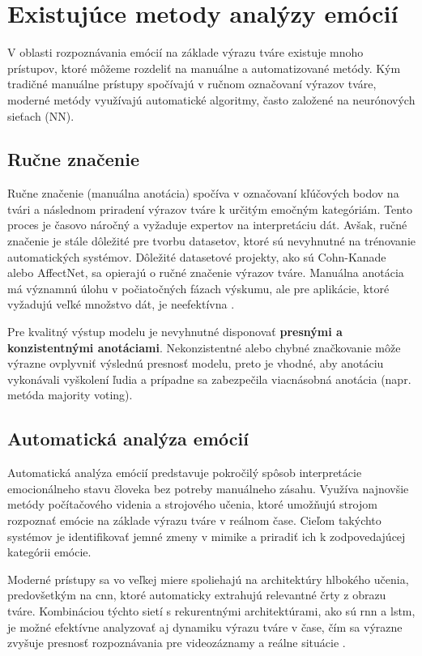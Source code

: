 \section{Existujúce metody analýzy emócií}
V oblasti rozpoznávania emócií na základe výrazu tváre existuje mnoho prístupov, ktoré môžeme rozdeliť na manuálne a automatizované metódy. Kým tradičné manuálne prístupy spočívajú v ručnom označovaní 
výrazov tváre, moderné metódy využívajú automatické algoritmy, často založené na neurónových sieťach (NN).

\subsection{Ručne značenie}
Ručne značenie (manuálna anotácia) spočíva v označovaní kľúčových bodov na tvári a následnom priradení výrazov tváre k určitým emočným kategóriám. Tento proces je časovo náročný a vyžaduje expertov 
na interpretáciu dát. Avšak, ručné značenie je stále dôležité pre tvorbu datasetov, ktoré sú nevyhnutné na trénovanie automatických systémov. Dôležité datasetové projekty, ako sú Cohn-Kanade alebo AffectNet, 
sa opierajú o ručné značenie výrazov tváre​. Manuálna anotácia má významnú úlohu v počiatočných fázach výskumu, ale pre aplikácie, ktoré vyžadujú veľké množstvo dát, je neefektívna \cite{article01}.

Pre kvalitný výstup modelu je nevyhnutné disponovať \textbf{presnými a konzistentnými anotáciami}. Nekonzistentné alebo chybné značkovanie môže výrazne ovplyvniť výslednú presnosť modelu, preto je vhodné, 
aby anotáciu vykonávali vyškolení ľudia a prípadne sa zabezpečila viacnásobná anotácia (napr. metóda majority voting).

\subsection{Automatická analýza emócií}

Automatická analýza emócií predstavuje pokročilý spôsob interpretácie emocionálneho stavu človeka bez potreby manuálneho zásahu. Využíva najnovšie metódy počítačového videnia a strojového učenia, ktoré umožňujú strojom rozpoznať emócie na základe výrazu tváre v reálnom čase. Cieľom takýchto systémov je identifikovať jemné zmeny v mimike a priradiť ich k zodpovedajúcej kategórii emócie.

Moderné prístupy sa vo veľkej miere spoliehajú na architektúry hlbokého učenia, predovšetkým na \gls{cnn}, ktoré automaticky extrahujú relevantné črty z obrazu tváre. Kombináciou týchto sietí s rekurentnými architektúrami, ako sú \gls{rnn} a \gls{lstm}, je možné efektívne analyzovať aj dynamiku výrazu tváre v čase, čím sa výrazne zvyšuje presnosť rozpoznávania pre videozáznamy a reálne situácie \cite{article01} \cite{misc01}.

